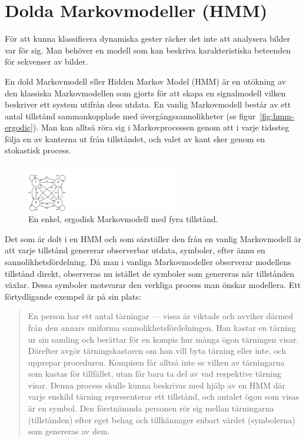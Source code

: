 \documentclass[../rapport_MVEX01-11-05]{subfiles}
\begin{document}
\section{Dolda Markovmodeller (HMM)}\label{sec:HMM}
För att kunna klassificera dynamiska gester räcker det inte att 
analysera bilder var för sig. Man behöver en modell som kan beskriva
karakteristiska beteenden för sekvenser av bilder.

En dold Markovmodell eller Hidden Markov Model (HMM) är en utökning
av den klassiska Markovmodellen som gjorts för att skapa en
signalmodell vilken beskriver ett system utifrån dess utdata.
En vanlig Markovmodell består av ett antal tillstånd sammankopplade
med övergångssannolikheter (se figur~\vref{fig:hmm-ergodic}). Man kan alltså
röra sig i Markovprocessen genom att i varje tidssteg följa en av kanterna
ut från tillståndet, och valet av kant sker genom en stokastisk process.

\begin{figure}[hb]
  \centering
  \includegraphics[width=0.6\textwidth,trim=0 0 935 80,clip=true]{bilder/ergodicHMM}
  \caption{En enkel, ergodisk Markovmodell med fyra tillstånd.}
  \label{fig:hmm-ergodic}
\end{figure}

Det som är dolt i en HMM och som särställer den från en vanlig Markovmodell
är att varje tillstånd genererar observerbar utdata, symboler, efter ännu en sannolikhetsfördelning. Då man i vanliga Markovmodeller
observerar modellens tillstånd direkt, observeras nu istället de
symboler som genereras när tillstånden växlar. Dessa symboler motsvarar
den verkliga process man önskar modellera. Ett förtydligande exempel
är på sin plats: 

\begin{quote}
En person har ett antal tärningar --- vissa är viktade och avviker därmed
från den annars uniforma sannolikhetsfördelningen.
Han kastar en tärning ur sin
samling och berättar för en kompis hur många ögon tärningen
visar. Därefter avgör tärningskastaren om han vill byta tärning eller
inte, och upprepar proceduren. Kompisen får alltså inte se vilken av
tärningarna som kastas för tillfället, utan får bara ta del av vad
respektive tärning visar. Denna process skulle kunna beskrivas med
hjälp av en HMM där varje enskild tärning representerar ett
tillstånd, och antalet ögon som visas är en symbol.
Den förstnämnda personen rör sig mellan tärningarna
(tillstånden) efter eget behag och tillkännager enbart värdet
(symbolerna) som genereras av dem. 
\end{quote}
\end{document}
